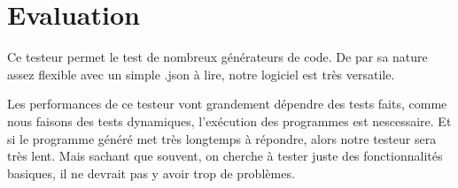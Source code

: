 \chapter{Evaluation}

Ce testeur permet le test de nombreux générateurs de code. De par sa nature assez
flexible avec un simple .json à lire, notre logiciel est très versatile.

Les performances de ce testeur vont grandement dépendre des tests faits, comme
nous faisons des tests dynamiques, l'exécution des programmes est nescessaire.
Et si le programme généré met très longtemps à répondre, alors notre testeur sera
très lent. Mais sachant que souvent, on cherche à tester juste des fonctionnalités
basiques, il ne devrait pas y avoir trop de problèmes.
